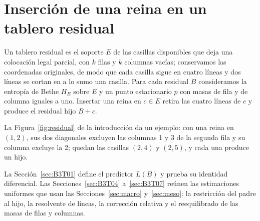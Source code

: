 \section{Inserción de una reina en un tablero residual}\label{sec:insercion}

Un tablero residual es el soporte $E$ de las casillas disponibles que deja una colocación legal
parcial, con $k$ filas y $k$ columnas vacías; conservamos las coordenadas originales, de modo que
cada casilla sigue en cuatro líneas y dos líneas se cortan en a lo sumo una casilla. Para cada
residual $B$ consideramos la entropía de Bethe $H_B$ sobre $E$ y un punto estacionario $p$ con masas
de fila y de columna iguales a uno. Insertar una reina en $c\in E$ retira las cuatro líneas de $c$ y
produce el residual hijo $B+c$.

La Figura~\ref{fig:residual} de la introducción da un ejemplo: con una reina en $(1,2)$, sus dos
diagonales excluyen las columnas 1 y 3 de la segunda fila y su columna excluye la 2; quedan las
casillas $(2,4)$ y $(2,5)$, y cada una produce un hijo.

La Sección~\ref{sec:B3T01} define el predictor $L(B)$ y prueba su identidad diferencial. Las
Secciones~\ref{sec:B3T04} a~\ref{sec:B3T07} reúnen las estimaciones uniformes que usan las
Secciones~\ref{sec:macro} y~\ref{sec:meso}: la restricción del padre al hijo, la resolvente de
líneas, la corrección relativa y el reequilibrado de las masas de filas y columnas.

